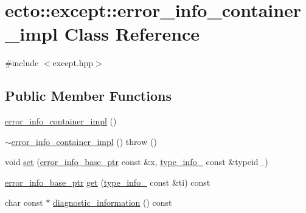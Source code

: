 \hypertarget{classecto_1_1except_1_1error__info__container__impl}{\section{ecto\-:\-:except\-:\-:error\-\_\-info\-\_\-container\-\_\-impl \-Class \-Reference}
\label{classecto_1_1except_1_1error__info__container__impl}
}


{\ttfamily \#include $<$except.\-hpp$>$}

\subsection*{\-Public \-Member \-Functions}
\begin{DoxyCompactItemize}
\item 
\hyperlink{classecto_1_1except_1_1error__info__container__impl_a258f844c2a2ee441c4e397971466f2c5}{error\-\_\-info\-\_\-container\-\_\-impl} ()
\item 
\hyperlink{classecto_1_1except_1_1error__info__container__impl_ab9391a11b1c7955810c184c07aec4858}{$\sim$error\-\_\-info\-\_\-container\-\_\-impl} ()  throw ()
\item 
void \hyperlink{classecto_1_1except_1_1error__info__container__impl_ac3931483b05bd3240a8ffe11c4977b99}{set} (\hyperlink{classecto_1_1except_1_1error__info__container__impl_a9fbca0758380cb123f790aee77d1d4d8}{error\-\_\-info\-\_\-base\-\_\-ptr} const \&x, \hyperlink{classecto_1_1except_1_1error__info__container__impl_abe4f51bf533842a5e0b81f3e43ae6267}{type\-\_\-info\-\_\-} const \&typeid\-\_\-)
\item 
\hyperlink{classecto_1_1except_1_1error__info__container__impl_a9fbca0758380cb123f790aee77d1d4d8}{error\-\_\-info\-\_\-base\-\_\-ptr} \hyperlink{classecto_1_1except_1_1error__info__container__impl_acab3219ea75b29048e2e4d8ad23028eb}{get} (\hyperlink{classecto_1_1except_1_1error__info__container__impl_abe4f51bf533842a5e0b81f3e43ae6267}{type\-\_\-info\-\_\-} const \&ti) const 
\item 
char const $\ast$ \hyperlink{classecto_1_1except_1_1error__info__container__impl_a9cd76f7d8bd75cdc5cf29061304a622a}{diagnostic\-\_\-information} () const 
\end{DoxyCompactItemize}
